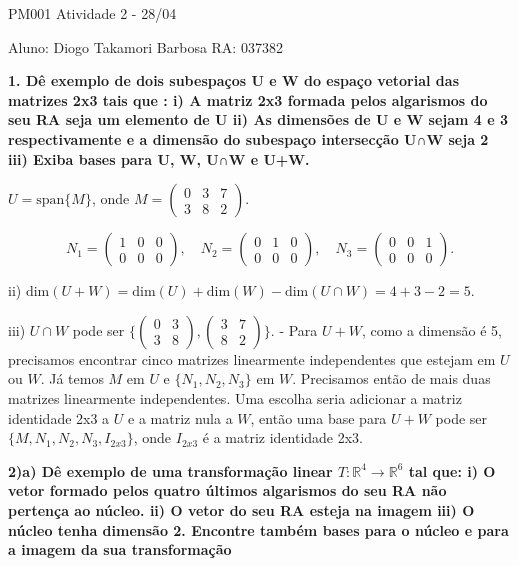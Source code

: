 PM001 Atividade 2 - 28/04

Aluno: Diogo Takamori Barbosa 
RA: 037382

\textbf{1. Dê exemplo de dois subespaços U e W do espaço vetorial das matrizes 2x3 tais que : 
i) A matriz 2x3 formada pelos algarismos do seu RA seja um elemento de U
ii) As dimensões de U e W sejam 4 e 3 respectivamente e a dimensão do subespaço intersecção U∩W seja 2 
iii) Exiba bases para U, W, U∩W e U+W. }


 \( U = \text{span}\{M\} \), onde \( M = \begin{pmatrix} 0 & 3 & 7 \\ 3 & 8 & 2 \end{pmatrix} \).

\[
N_1 = \begin{pmatrix} 1 & 0 & 0 \\ 0 & 0 & 0 \end{pmatrix}, \quad N_2 = \begin{pmatrix} 0 & 1 & 0 \\ 0 & 0 & 0 \end{pmatrix}, \quad N_3 = \begin{pmatrix} 0 & 0 & 1 \\ 0 & 0 & 0 \end{pmatrix}.
\]



ii) \( \text{dim}(U + W) = \text{dim}(U) + \text{dim}(W) - \text{dim}(U \cap W) = 4 + 3 - 2 = 5 \).

iii) \( U \cap W \) pode ser \( \{ \begin{pmatrix} 0 & 3 \\ 3 & 8 \end{pmatrix}, \begin{pmatrix} 3 & 7 \\ 8 & 2 \end{pmatrix} \} \).
- Para \( U + W \), como a dimensão é 5, precisamos encontrar cinco matrizes linearmente independentes que estejam em \( U \) ou \( W \). Já temos \( M \) em \( U \) e \( \{N_1, N_2, N_3\} \) em \( W \). Precisamos então de mais duas matrizes linearmente independentes. Uma escolha seria adicionar a matriz identidade 2x3 a \( U \) e a matriz nula a \( W \), então uma base para \( U + W \) pode ser \( \{ M, N_1, N_2, N_3, I_{2x3} \} \), onde \( I_{2x3} \) é a matriz identidade 2x3.

\textbf{2)a) Dê exemplo de uma transformação linear \( T : \mathbb{R}^4 \rightarrow \mathbb{R}^6 \) tal que:
i) O vetor formado pelos quatro últimos algarismos do seu RA não pertença ao núcleo.
ii) O vetor do seu RA esteja na imagem
iii) O núcleo tenha dimensão 2. Encontre também bases para o núcleo e para a imagem da sua transformação}


